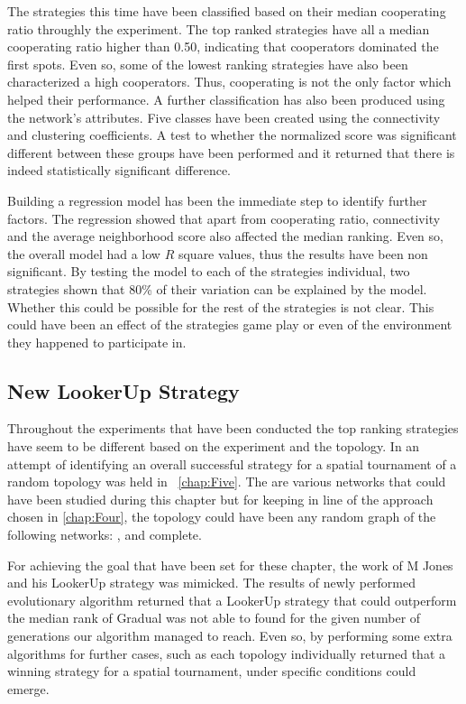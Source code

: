 The strategies this time have been classified based on their median cooperating
ratio throughly the experiment. The top ranked strategies have all a median cooperating
ratio higher than 0.50, indicating that cooperators
dominated the first spots. Even so, some of the lowest ranking strategies have
also been characterized a high cooperators. Thus, cooperating is not the only
factor which helped their performance. A further classification has also been
produced using the network's attributes. Five classes have been created using
the connectivity and clustering coefficients. A test to whether the normalized
score was significant different between these groups have been performed and it
returned that there is indeed statistically significant difference.

Building a regression model has been the immediate step to identify further factors.
The regression showed that apart from cooperating ratio, connectivity and the
average neighborhood score also affected the median ranking. Even so, the overall model
had a low \(R\) square values, thus the results have been non significant. By testing
the model to each of the strategies individual, two strategies shown that 80\% of
their variation can be explained by the model. Whether this could be possible
for the rest of the strategies is not clear. This could have been an effect of
the strategies game play or even of the environment they happened to participate in.

\subsection{New LookerUp Strategy}

Throughout the experiments that have been conducted the top ranking strategies
have seem to be different based on the experiment and the topology. In an attempt
of identifying an overall successful strategy for a spatial tournament of
a random topology was held in ~\autoref{chap:Five}. The are various networks
that could have been studied during this chapter but for keeping in line of
the approach chosen in \autoref{chap:Four}, the topology could have been any
random graph of the following networks: , and complete.

For achieving the goal that have been set for these chapter, the work of
M Jones and his LookerUp strategy was mimicked. The results of newly performed
evolutionary algorithm returned that a LookerUp strategy that could outperform
the median rank of Gradual was not able to found for the given number of generations
our algorithm managed to reach. Even so, by performing some extra algorithms for further
cases, such as each topology individually returned that a winning strategy for
a spatial tournament, under specific conditions could emerge.

